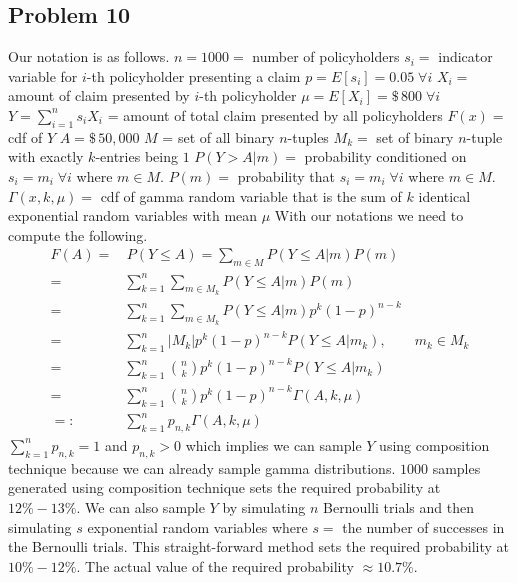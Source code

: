 \documentclass{article}
\begin{document}
\subsection*{Problem 10}
Our notation is as follows.
\newline
$n = 1000 = $ number of policyholders
\newline
$s_i = $ indicator variable for $i$-th policyholder presenting a claim
\newline
$p = E[s_i] = 0.05\;\forall i$
\newline
$X_i = $ amount of claim presented by $i$-th policyholder
\newline
$\mu = E[X_i] = \$\, 800\;\forall i$
\newline
$Y = \sum_{i=1}^n s_i X_i$ = amount of total claim presented by all policyholders
\newline
$F(x) = $ cdf of $Y$
\newline
$A = \$\,50,000$
\newline
$M$ = set of all binary $n$-tuples
\newline
$M_k = $  set of binary $n$-tuple with exactly $k$-entries being $1$
\newline
$P(Y > A|m) = $ probability conditioned on $s_i=m_i\;\forall i$ where $m\in M$.
\newline
$P(m) = $ probability that $s_i = m_i\;\forall i$ where $m\in M$.
\newline
$\Gamma(x, k, \mu) = $ cdf of gamma random variable that is the sum of $k$ identical exponential random variables with mean $\mu$
\newline
With our notations we need to compute the following.
\begin{align*}
F(A) =& \,P(Y \le A) = \sum_{m\in M}P(Y \le A| m)P(m) \\
=& \sum_{k=1}^n\sum_{m\in M_k}P(Y \le A| m)P(m) \\
=& \sum_{k=1}^n\sum_{m\in M_k}P(Y \le A| m)p^k(1-p)^{n-k} \\
=& \sum_{k=1}^n |M_k|p^k(1-p)^{n-k} P(Y \le A| m_k) ,\qquad m_k\in M_k \\
=& \sum_{k=1}^n \binom{n}{k}p^k(1-p)^{n-k}P(Y \le A| m_k) \\
=& \sum_{k=1}^n \binom{n}{k}p^k(1-p)^{n-k}\Gamma(A, k, \mu) \\
=:& \sum_{k=1}^n p_{n,k}\Gamma(A, k, \mu)
\end{align*}
$\sum_{k=1}^n p_{n,k} = 1$ and $p_{n,k} > 0$ which implies we can sample $Y$ using composition technique because we can already sample gamma distributions. $1000$ samples generated using composition technique sets the required probability at $12\% - 13\%$. We can also sample $Y$ by simulating $n$ Bernoulli trials and then simulating $s$ exponential random variables where $s = $ the number of successes in the Bernoulli trials. This straight-forward method sets the required probability at $10\%-12\%$. The actual value of the required probability $\approx 10.7\%$.
\end{document}
